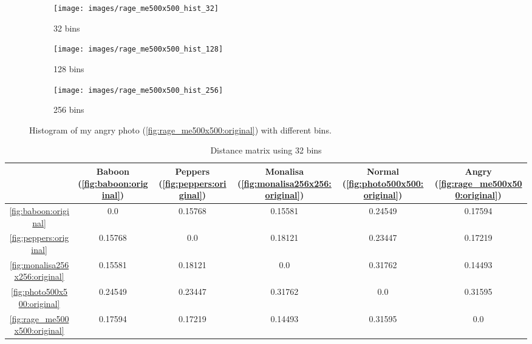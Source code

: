 \documentclass[journal]{IEEEtran}
\begin{document}
\begin{figure}
	\centering
	\begin{subfigure}{0.15\textwidth}
		\centering
		\texttt{[image: images/rage\_me500x500\_hist\_32]} 
		\caption{32 bins}
		\label{fig:rage_me500x500:hist:32}
	\end{subfigure}
	\centering
	\begin{subfigure}{0.15\textwidth}
		\centering
		\texttt{[image: images/rage\_me500x500\_hist\_128]} 
		\caption{128 bins}
		\label{fig:rage_me500x500:hist:128}
	\end{subfigure}
	\centering
	\begin{subfigure}{0.15\textwidth}
		\centering
		\texttt{[image: images/rage\_me500x500\_hist\_256]} 
		\caption{256 bins}
		\label{fig:rage_me500x500:hist:256}
	\end{subfigure}
	
	\caption{Histogram of my angry photo (\ref{fig:rage_me500x500:original}) with different bins.}
	\label{fig:rage_me500x500:hist}
\end{figure}

\begin{table}
	\begin{tabular}{ | c | c | c | c | c | c |}
		\hline
		& Baboon (\ref{fig:baboon:original}) & Peppers (\ref{fig:peppers:original}) & Monalisa (\ref{fig:monalisa256x256:original}) & Normal (\ref{fig:photo500x500:original}) & Angry (\ref{fig:rage_me500x500:original}) \\ \hline
		\ref{fig:baboon:original} & 0.0 & 0.15768 & 0.15581 & 0.24549 & 0.17594 \\
		\ref{fig:peppers:original} & 0.15768 & 0.0 & 0.18121 & 0.23447 & 0.17219 \\
		\ref{fig:monalisa256x256:original} & 0.15581 & 0.18121 & 0.0 & 0.31762 & 0.14493 \\
		\ref{fig:photo500x500:original} & 0.24549 & 0.23447 & 0.31762 & 0.0 & 0.31595 \\
		\ref{fig:rage_me500x500:original} & 0.17594 & 0.17219 & 0.14493 & 0.31595 & 0.0 \\
		\hline
	\end{tabular}
	\caption{Distance matrix using 32 bins}
	\label{tab:conf_matrix:32bins}
\end{table}
\end{document}
